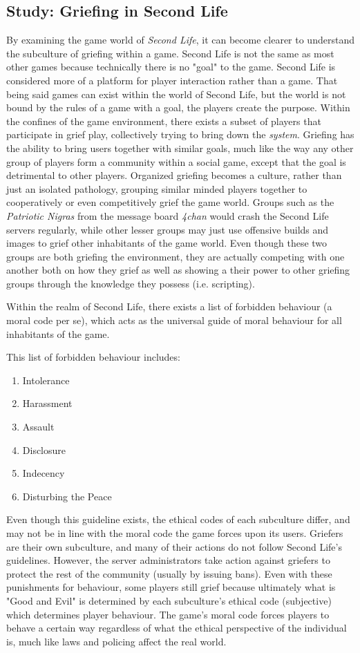 \documentclass[12pt]{report}
\begin{document}
\subsection{Study: Griefing in Second Life}
By examining the game world of \textit{Second Life}, it can become clearer to understand the subculture of griefing within a game. Second Life is not the same as most other games because technically there is no "goal" to the game. Second Life is considered more of a platform for player interaction rather than a game. That being said games can exist within the world of Second Life, but the world is not bound by the rules of a game with a goal, the players create the purpose. Within the confines of the game environment, there exists a subset of players that participate in grief play, collectively trying to bring down the \textit{system}. Griefing has the ability to bring users together with similar goals, much like the way any other group of players form a community within a social game, except that the goal is detrimental to other players. Organized griefing becomes a culture, rather than just an isolated pathology, grouping similar minded players together to cooperatively or even competitively grief the game world.\cite{Goon_culture} Groups such as the \textit{Patriotic Nigras} from the message board \textit{4chan} would crash the Second Life servers regularly, while other lesser groups may just use offensive builds and images to grief other inhabitants of the game world. Even though these two groups are both griefing the environment, they are actually competing with one another both on how they grief as well as showing a their power to other griefing groups through the knowledge they possess (i.e. scripting).

Within the realm of Second Life, there exists a list of forbidden behaviour (a moral code per se), which acts as the universal guide of moral behaviour for all inhabitants of the game. 

This list of forbidden behaviour includes:
\begin{enumerate}
\item Intolerance
\item Harassment
\item Assault
\item Disclosure
\item Indecency
\item Disturbing the Peace
\end{enumerate}

Even though this guideline exists, the ethical codes of each subculture differ, and may not be in line with the moral code the game forces upon its users. Griefers are their own subculture, and many of their actions do not follow Second Life's guidelines. However, the server administrators take action against griefers to protect the rest of the community (usually by issuing bans).\cite{Griefing} Even with these punishments for behaviour, some players still grief because ultimately what is "Good and Evil" is determined by each subculture's ethical code (subjective) which determines player behaviour. The game's moral code forces players to behave a certain way regardless of what the ethical perspective of the individual is, much like laws and policing affect the real world.
\end{document}
